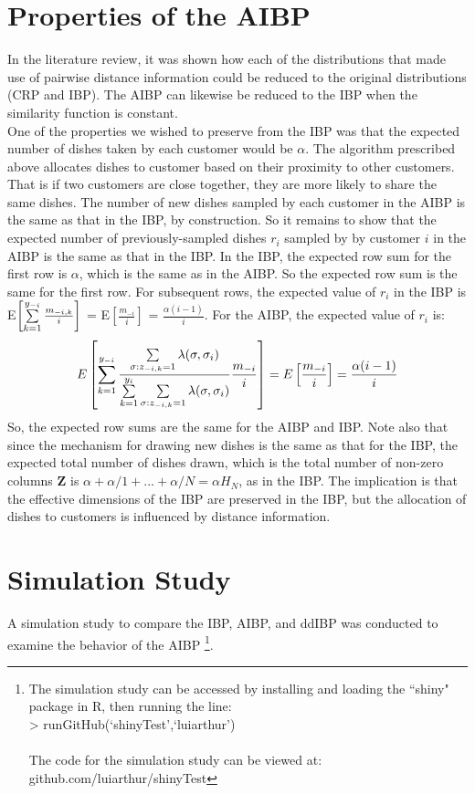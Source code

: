\section{Properties of the AIBP}
In the literature review, it was shown how each of the distributions that made
use of pairwise distance information could be reduced to the original
distributions (CRP and IBP). The AIBP can likewise be reduced to the IBP when
the similarity function is constant.\\
\noindent
One of the properties we wished to preserve from the IBP was that the expected
number of dishes taken by each customer would be $\alpha$. The algorithm
prescribed above allocates dishes to customer based on their proximity to other
customers.  That is if two customers are close together, they are more likely
to share the same dishes. The number of new dishes sampled by each customer in
the AIBP is the same as that in the IBP, by construction. So it remains to show
that the expected number of previously-sampled dishes $r_i$ sampled by by
customer $i$ in the AIBP is the same as that in the IBP. In the IBP, the
expected row sum for the first row is $\alpha$, which is the same as in the
AIBP. So the expected row sum is the same for the first row. For subsequent
rows, the expected value of $r_i$ in the IBP is E$\left[\sum\limits_{k=1}^{y_{-i}}
\frac{m_{-i,k}}{i}\right]$ = E$\left[\frac{m_{-i}}{i}\right]$ =
$\frac{\alpha(i-1)}{i}$. For the AIBP, the expected value of $r_i$ is:
\[
  E\left[\sum\limits_{k=1}^{y_{-i}}\displaystyle\frac{\sum\limits_{\sigma:z_{-i,k}=1}^{}\lambda(\sigma,\sigma_i)} {\sum\limits_{k=1}^{y_i}\sum\limits_{\sigma:z_{-i,k}=1}^{}\lambda(\sigma,\sigma_i)} \frac{m_{-i}}{i}\right] = 
  E\left[\frac{m_{-i}}{i}\right] = \frac{\alpha(i-1)}{i}
\]
So, the expected row sums are the same for the AIBP and IBP. Note also that
since the mechanism for drawing new dishes is the same as that for the IBP, the
expected total number of dishes drawn, which is the total number of non-zero
columns $\bm Z$ is $\alpha+\alpha/1+...+\alpha/N = \alpha H_N$, as in the IBP. 
The implication is that the effective dimensions of the IBP are preserved in the
IBP, but the allocation of dishes to customers is influenced by distance 
information.\\

\section{Simulation Study}
A simulation study to compare the IBP, AIBP, and ddIBP was conducted to examine
the behavior of the AIBP \footnote{The simulation study can be accessed by
installing and loading the ``shiny" package in R, then running the line: \\
> runGitHub(`shinyTest',`luiarthur')\\\\
The code for the simulation study can be viewed at: \\
github.com/luiarthur/shinyTest}. 

